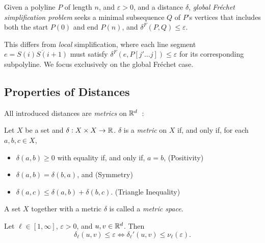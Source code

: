 \begin{definition}
	Given a polyline \(P\) of length \(n\), and \(\varepsilon > 0\), and a distance \(\delta\), \emph{global Fréchet simplification problem} seeks a minimal subsequence \(Q\) of \(P\)'s vertices that includes both the start \(P(0)\) and end \(P(n)\), and \(\delta^F(P, Q) \leq \varepsilon\).
\end{definition}

This differs from \emph{local} simplification, where each line segment \(e = \overline{S(i)S(i+1)}\) must satisfy \(\delta^F(e, P[j' \dots j]) \leq \varepsilon\) for its corresponding subpolyline. We focus exclusively on the global Fréchet case.

\subsection{Properties of Distances}
All introduced distances are \emph{metrics} on \(\mathbb{R}^d\)~\cite{metric_spaces}:

\begin{definition}\label{def:metric}
  Let \(X\) be a set and \(\delta:X\times X \to \mathbb{R}\). \(\delta\) is a \emph{metric} on \(X\) if, and only if, for each \(a, b, c \in X\), 
  \begin{itemize}
    \item \(\delta(a, b) \geq 0\) with equality if, and only if, \(a = b\), \hfill (Positivity)
    \item \(\delta(a, b) = \delta(b, a)\), and \hfill (Symmetry)
    \item \(\delta(a, c) \leq \delta(a, b) + \delta(b, c)\). \hfill (Triangle Inequality)
  \end{itemize}

  A set \(X\) together with a metric \(\delta\) is called a \emph{metric space}.
\end{definition}

\begin{observation}\label{obs:unnormalize}
  Let \(\ell \in [1, \infty]\), \(\varepsilon > 0\), and \(u, v \in \mathbb{R}^d\). Then 
    \[\delta_\ell(u, v) \leq \varepsilon \iff \delta_\ell'(u, v) \leq \nu_\ell(\varepsilon).\]
\end{observation}


